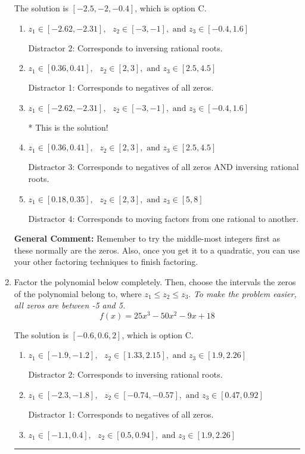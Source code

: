 \documentclass{extbook}[14pt]
\newcommand{\litem}[1]{\item #1

\rule{\textwidth}{0.4pt}}
\begin{document}
\begin{enumerate}
{The solution is \( [-2.5, -2, -0.4] \), which is option C.\begin{enumerate}[label=\Alph*.]
\item \( z_1 \in [-2.62, -2.31], \text{   }  z_2 \in [-3, -1], \text{   and   } z_3 \in [-0.4, 1.6] \)

 Distractor 2: Corresponds to inversing rational roots.
\item \( z_1 \in [0.36, 0.41], \text{   }  z_2 \in [2, 3], \text{   and   } z_3 \in [2.5, 4.5] \)

 Distractor 1: Corresponds to negatives of all zeros.
\item \( z_1 \in [-2.62, -2.31], \text{   }  z_2 \in [-3, -1], \text{   and   } z_3 \in [-0.4, 1.6] \)

* This is the solution!
\item \( z_1 \in [0.36, 0.41], \text{   }  z_2 \in [2, 3], \text{   and   } z_3 \in [2.5, 4.5] \)

 Distractor 3: Corresponds to negatives of all zeros AND inversing rational roots.
\item \( z_1 \in [0.18, 0.35], \text{   }  z_2 \in [2, 3], \text{   and   } z_3 \in [5, 8] \)

 Distractor 4: Corresponds to moving factors from one rational to another.
\end{enumerate}

\textbf{General Comment:} Remember to try the middle-most integers first as these normally are the zeros. Also, once you get it to a quadratic, you can use your other factoring techniques to finish factoring.
}
\litem{
Factor the polynomial below completely. Then, choose the intervals the zeros of the polynomial belong to, where $z_1 \leq z_2 \leq z_3$. \textit{To make the problem easier, all zeros are between -5 and 5.}
\[ f(x) = 25x^{3} -50 x^{2} -9 x + 18 \]

The solution is \( [-0.6, 0.6, 2] \), which is option C.\begin{enumerate}[label=\Alph*.]
\item \( z_1 \in [-1.9, -1.2], \text{   }  z_2 \in [1.33, 2.15], \text{   and   } z_3 \in [1.9, 2.26] \)

 Distractor 2: Corresponds to inversing rational roots.
\item \( z_1 \in [-2.3, -1.8], \text{   }  z_2 \in [-0.74, -0.57], \text{   and   } z_3 \in [0.47, 0.92] \)

 Distractor 1: Corresponds to negatives of all zeros.
\item \( z_1 \in [-1.1, 0.4], \text{   }  z_2 \in [0.5, 0.94], \text{   and   } z_3 \in [1.9, 2.26] \)


\end{enumerate}}
\end{enumerate}
\end{document}
